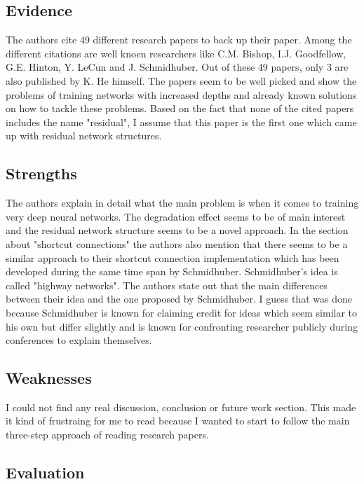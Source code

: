 \documentclass[a4paper]{article}
\begin{document}
\subsection{Evidence}

The authors cite 49 different research papers to back up their paper. Among the different citations are well knoen researchers like C.M. Bishop, I.J. Goodfellow, G.E. Hinton, Y. LeCun and J. Schmidhuber. Out of these 49 papers, only 3 are also published by K. He himself. The papers seem to be well picked and show the problems of training networks with increased depths and already known solutions on how to tackle these problems. Based on the fact that none of the cited papers includes the name "residual", I assume that this paper is the first one which came up with residual network structures.

\subsection{Strengths}

The authors explain in detail what the main problem is when it comes to training very deep neural networks. The degradation effect seems to be of main interest and the residual network structure seems to be a novel approach. In the section about "shortcut connections" the authors also mention that there seems to be a similar approach to their shortcut connection implementation which has been developed during the same time span by Schmidhuber. Schmidhuber's idea is called "highway networks". The authors state out that the main differences between their idea and the one proposed by Schmidhuber. I guess that was done because Schmidhuber is known for claiming credit for ideas which seem similar to his own but differ slightly and is known for confronting researcher publicly during conferences to explain themselves.

\subsection{Weaknesses}

I could not find any real discussion, conclusion or future work section. This made it kind of frustraing for me to read because I wanted to start to follow the main three-step approach of reading research papers. 

\subsection{Evaluation}
\end{document}
